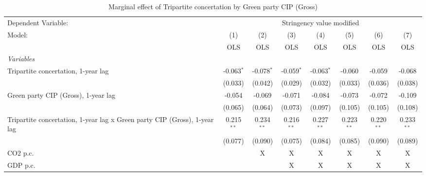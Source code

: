 
\begin{table}[htbp]
   \caption{Marginal effect of Tripartite concertation by Green party CIP (Gross)}
   \centering
   \begin{tabular}{lccccccc}
      \toprule
      Dependent Variable: & \multicolumn{7}{c}{Stringency value modified}\\
      Model:                                                                    & (1)          & (2)          & (3)          & (4)          & (5)          & (6)          & (7)\\  
                                                                                &  OLS         & OLS          & OLS          & OLS          & OLS          & OLS          & OLS\\  
      \midrule
      \emph{Variables}\\
      Tripartite concertation, 1-year lag                                       & -0.063$^{*}$ & -0.078$^{*}$ & -0.059$^{*}$ & -0.063$^{*}$ & -0.060       & -0.059       & -0.068\\   
                                                                                & (0.033)      & (0.042)      & (0.029)      & (0.032)      & (0.033)      & (0.036)      & (0.038)\\   
      Green party CIP (Gross), 1-year lag                                       & -0.054       & -0.069       & -0.071       & -0.084       & -0.073       & -0.072       & -0.109\\   
                                                                                & (0.065)      & (0.064)      & (0.073)      & (0.097)      & (0.105)      & (0.105)      & (0.108)\\   
      Tripartite concertation, 1-year lag x Green party CIP (Gross), 1-year lag & 0.215$^{**}$ & 0.234$^{**}$ & 0.216$^{**}$ & 0.227$^{**}$ & 0.223$^{**}$ & 0.220$^{**}$ & 0.233$^{**}$\\   
                                                                                & (0.077)      & (0.090)      & (0.075)      & (0.084)      & (0.085)      & (0.090)      & (0.089)\\   
      CO2 p.c.                                                                  &              & X            & X            & X            & X            & X            & X\\  
      GDP p.c.                                                                  &              &              & X            & X            & X            & X            & X\\  

\end{tabular}
\end{table}
